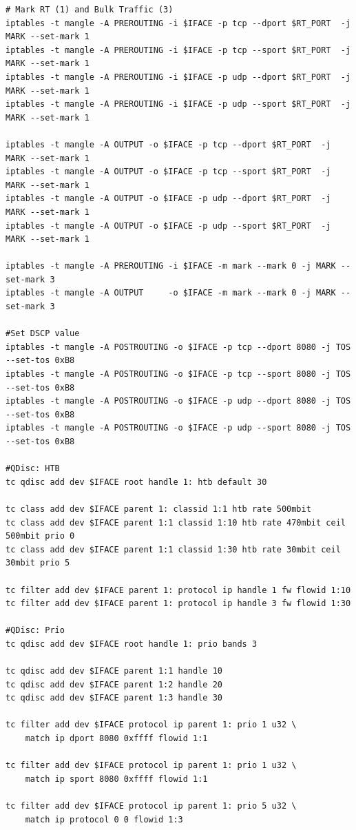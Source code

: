 \begin{listing}[htbp]
    \centering
\begin{verbatim}
# Mark RT (1) and Bulk Traffic (3)
iptables -t mangle -A PREROUTING -i $IFACE -p tcp --dport $RT_PORT  -j MARK --set-mark 1
iptables -t mangle -A PREROUTING -i $IFACE -p tcp --sport $RT_PORT  -j MARK --set-mark 1
iptables -t mangle -A PREROUTING -i $IFACE -p udp --dport $RT_PORT  -j MARK --set-mark 1
iptables -t mangle -A PREROUTING -i $IFACE -p udp --sport $RT_PORT  -j MARK --set-mark 1

iptables -t mangle -A OUTPUT -o $IFACE -p tcp --dport $RT_PORT  -j MARK --set-mark 1
iptables -t mangle -A OUTPUT -o $IFACE -p tcp --sport $RT_PORT  -j MARK --set-mark 1
iptables -t mangle -A OUTPUT -o $IFACE -p udp --dport $RT_PORT  -j MARK --set-mark 1
iptables -t mangle -A OUTPUT -o $IFACE -p udp --sport $RT_PORT  -j MARK --set-mark 1

iptables -t mangle -A PREROUTING -i $IFACE -m mark --mark 0 -j MARK --set-mark 3
iptables -t mangle -A OUTPUT     -o $IFACE -m mark --mark 0 -j MARK --set-mark 3

#Set DSCP value
iptables -t mangle -A POSTROUTING -o $IFACE -p tcp --dport 8080 -j TOS --set-tos 0xB8
iptables -t mangle -A POSTROUTING -o $IFACE -p tcp --sport 8080 -j TOS --set-tos 0xB8
iptables -t mangle -A POSTROUTING -o $IFACE -p udp --dport 8080 -j TOS --set-tos 0xB8
iptables -t mangle -A POSTROUTING -o $IFACE -p udp --sport 8080 -j TOS --set-tos 0xB8

#QDisc: HTB
tc qdisc add dev $IFACE root handle 1: htb default 30

tc class add dev $IFACE parent 1: classid 1:1 htb rate 500mbit
tc class add dev $IFACE parent 1:1 classid 1:10 htb rate 470mbit ceil 500mbit prio 0
tc class add dev $IFACE parent 1:1 classid 1:30 htb rate 30mbit ceil 30mbit prio 5

tc filter add dev $IFACE parent 1: protocol ip handle 1 fw flowid 1:10
tc filter add dev $IFACE parent 1: protocol ip handle 3 fw flowid 1:30

#QDisc: Prio
tc qdisc add dev $IFACE root handle 1: prio bands 3

tc qdisc add dev $IFACE parent 1:1 handle 10
tc qdisc add dev $IFACE parent 1:2 handle 20
tc qdisc add dev $IFACE parent 1:3 handle 30

tc filter add dev $IFACE protocol ip parent 1: prio 1 u32 \
    match ip dport 8080 0xffff flowid 1:1

tc filter add dev $IFACE protocol ip parent 1: prio 1 u32 \
    match ip sport 8080 0xffff flowid 1:1

tc filter add dev $IFACE protocol ip parent 1: prio 5 u32 \
    match ip protocol 0 0 flowid 1:3
    
\end{verbatim}
\caption{QoS settings used in this work}
\label{lst:qos}
\end{listing}

